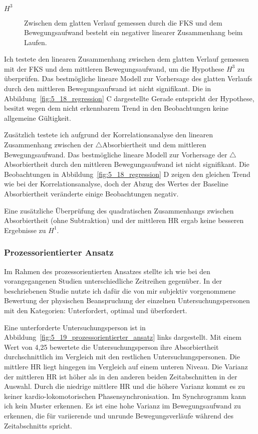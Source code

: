 \begin{description}
	\item[$H^3$] Zwischen dem glatten Verlauf gemessen durch die \ac{FKS} und dem Bewegungsaufwand besteht ein negativer linearer Zusammenhang beim Laufen.
\end{description}

Ich testete den linearen Zusammenhang zwischen dem glatten Verlauf gemessen mit der \ac{FKS} und dem mittleren Bewegungsaufwand, um die Hypothese $H^3$ zu überprüfen. Das bestmögliche lineare Modell zur Vorhersage des glatten Verlaufs durch den mittleren Bewegungsaufwand ist nicht signifikant. Die in Abbildung~\ref{fig:5_18_regression} C dargestellte Gerade entspricht der Hypothese, besitzt wegen dem nicht erkennbarem Trend in den Beobachtungen keine allgemeine Gültigkeit.

Zusätzlich testete ich aufgrund der Korrelationsanalyse den linearen Zusammenhang zwischen der $\bigtriangleup$Absorbiertheit und dem mittleren Bewegungsaufwand. Das bestmögliche lineare Modell zur Vorhersage der $\bigtriangleup$Absorbiertheit durch den mittleren Bewegungsaufwand ist nicht signifikant. Die Beobachtungen in Abbildung~\ref{fig:5_18_regression} D zeigen den gleichen Trend wie bei der Korrelationsanalyse, doch der Abzug des Wertes der Baseline Absorbiertheit veränderte einige Beobachtungen negativ.

Eine zusätzliche Überprüfung des quadratischen Zusammenhangs zwischen Absorbiertheit (ohne Subtraktion) und der mittleren \ac{HR} ergab keine besseren Ergebnisse zu $H^1$.

\subsubsection{Prozessorientierter Ansatz}
Im Rahmen des prozessorientierten Ansatzes stellte ich wie bei den vorangegangenen Studien unterschiedliche Zeitreihen gegenüber. In der beschriebenen Studie nutzte ich dafür die von mir subjektiv vorgenommene Bewertung der physischen Beanspruchung der einzelnen Untersuchungspersonen mit den Kategorien: Unterfordert, optimal und überfordert.

Eine unterforderte Untersuchungsperson ist in Abbildung~\ref{fig:5_19_prozessorientierter_ansatz} links dargestellt. Mit einem Wert von 4,25 bewertete die Untersuchungsperson ihre Absorbiertheit durchschnittlich im Vergleich mit den restlichen Untersuchungspersonen. Die mittlere \ac{HR} liegt hingegen im Vergleich auf einem unteren Niveau. Die Varianz der mittleren \ac{HR} ist höher als in den anderen beiden Zeitabschnitten in der Auswahl. Durch die niedrige mittlere \ac{HR} und die höhere Varianz kommt es zu keiner kardio-lokomotorischen Phasensynchronisation. Im Synchrogramm kann ich kein Muster erkennen. Es ist eine hohe Varianz im Bewegungsaufwand zu erkennen, die für variierende und unrunde Bewegungsverläufe während des Zeitabschnitts spricht. 

